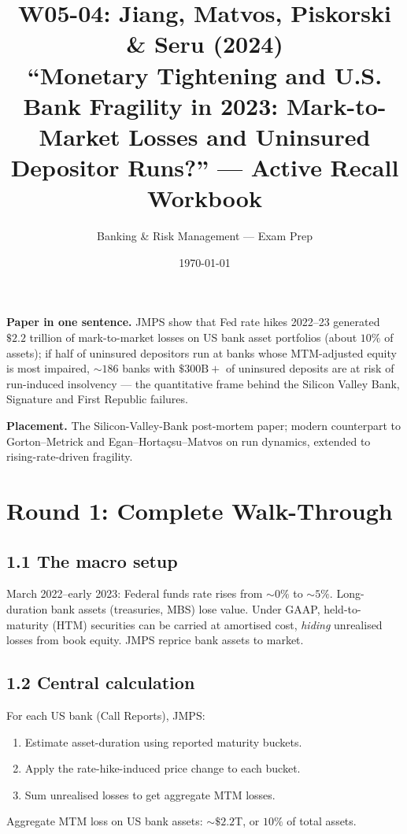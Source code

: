 \documentclass[11pt]{article}
\title{W05-04: Jiang, Matvos, Piskorski \& Seru (2024) \\
\large ``Monetary Tightening and U.S. Bank Fragility in 2023: Mark-to-Market Losses and Uninsured Depositor Runs?'' --- Active Recall Workbook}
\author{Banking \& Risk Management --- Exam Prep}
\date{\today}
\begin{document}
\maketitle

\begin{keybox}
\textbf{Paper in one sentence.} JMPS show that Fed rate hikes 2022--23 generated $\$2.2$ trillion of mark-to-market losses on US bank asset portfolios (about $10\%$ of assets); if half of uninsured depositors run at banks whose MTM-adjusted equity is most impaired, $\sim 186$ banks with $\$300\text{B}+$ of uninsured deposits are at risk of run-induced insolvency --- the quantitative frame behind the Silicon Valley Bank, Signature and First Republic failures.

\textbf{Placement.} The Silicon-Valley-Bank post-mortem paper; modern counterpart to Gorton--Metrick and Egan--Hortaçsu--Matvos on run dynamics, extended to rising-rate-driven fragility.
\end{keybox}

\section*{Round 1: Complete Walk-Through}

\subsection*{1.1 The macro setup}
March 2022--early 2023: Federal funds rate rises from $\sim 0\%$ to $\sim 5\%$. Long-duration bank assets (treasuries, MBS) lose value. Under GAAP, held-to-maturity (HTM) securities can be carried at amortised cost, \emph{hiding} unrealised losses from book equity. JMPS reprice bank assets to market.

\subsection*{1.2 Central calculation}
For each US bank (Call Reports), JMPS:
\begin{enumerate}
\item Estimate asset-duration using reported maturity buckets.
\item Apply the rate-hike-induced price change to each bucket.
\item Sum unrealised losses to get aggregate MTM losses.
\end{enumerate}
Aggregate MTM loss on US bank assets: $\sim \$2.2$T, or $10\%$ of total assets.
\end{document}
